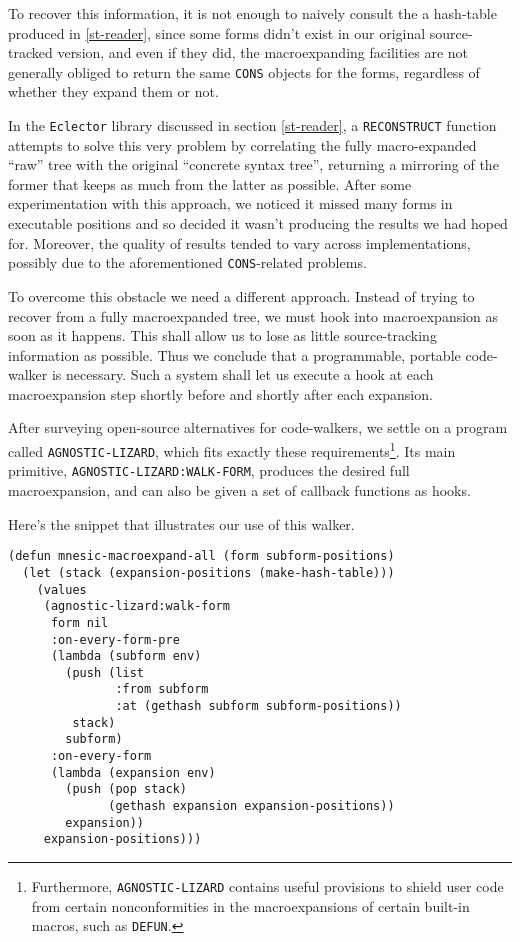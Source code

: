 \documentclass[sigconf]{acmart}
\begin{document}
To recover this information, it is not enough to naively consult the a
hash-table produced in \ref{st-reader}, since some forms didn't
exist in our original source-tracked version, and even if they did,
the macroexpanding facilities are not generally obliged to return the
same \texttt{CONS} objects for the forms, regardless of whether they
expand them or not.

In the \texttt{Eclector} library discussed in section \ref{st-reader},
a \texttt{RECONSTRUCT} function attempts to solve this very problem by
correlating the fully macro-expanded ``raw'' tree with the original
``concrete syntax tree'', returning a mirroring of the former that
keeps as much from the latter as possible.  After some experimentation
with this approach, we noticed it missed many forms in executable
positions and so decided it wasn't producing the results we had hoped
for.  Moreover, the quality of results tended to vary across
implementations, possibly due to the aforementioned
\texttt{CONS}-related problems.

To overcome this obstacle we need a different approach.  Instead of
trying to recover from a fully macroexpanded tree, we must hook into
macroexpansion as soon as it happens.  This shall allow us to lose as
little source-tracking information as possible.  Thus we conclude that
a programmable, portable code-walker is necessary.  Such a system
shall let us execute a hook at each macroexpansion step shortly before
and shortly after each expansion.

After surveying open-source alternatives for code-walkers, we settle
on a program called \texttt{AGNOSTIC-LIZARD}\cite{agnostic-lizard},
which fits exactly these requirements\footnote{Furthermore,
  \texttt{AGNOSTIC-LIZARD} contains useful provisions to shield user
  code from certain nonconformities in the macroexpansions of certain
  built-in macros, such as \texttt{DEFUN}.}.  Its main primitive,
\texttt{AGNOSTIC-LIZARD:WALK-FORM}, produces the desired full
macroexpansion, and can also be given a set of callback functions as
hooks.

Here's the snippet that illustrates our use of this walker.

\begin{verbatim}
(defun mnesic-macroexpand-all (form subform-positions)
  (let (stack (expansion-positions (make-hash-table)))
    (values
     (agnostic-lizard:walk-form
      form nil
      :on-every-form-pre
      (lambda (subform env)
        (push (list
               :from subform
               :at (gethash subform subform-positions))
         stack)
        subform)
      :on-every-form
      (lambda (expansion env)
        (push (pop stack)
              (gethash expansion expansion-positions))
        expansion))
     expansion-positions)))
\end{verbatim}
\end{document}
